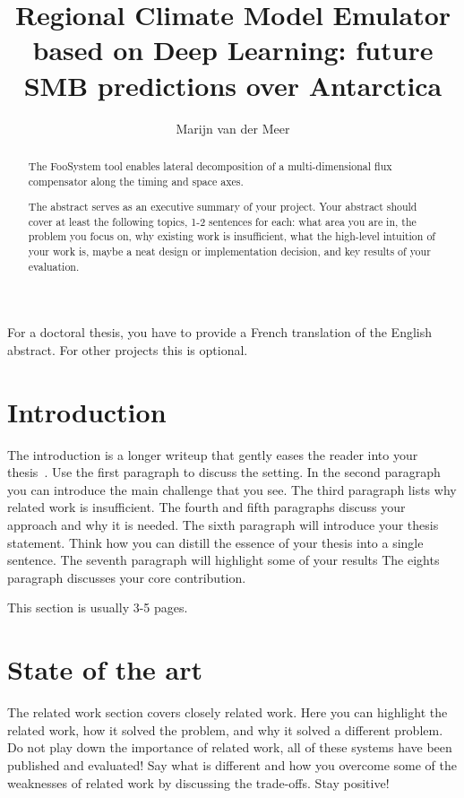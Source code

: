 \documentclass[a4paper,11pt,oneside]{report}
\title{Regional Climate Model Emulator based on Deep Learning: future SMB predictions over Antarctica}
\author{Marijn van der Meer}
\newcommand{\sysname}{FooSystem\xspace}
\begin{document}
\maketitle
\makededication
\makeacks

\begin{abstract}
The \sysname tool enables lateral decomposition of a multi-dimensional
flux compensator along the timing and space axes.

The abstract serves as an executive summary of your project.
Your abstract should cover at least the following topics, 1-2 sentences for
each: what area you are in, the problem you focus on, why existing work is
insufficient, what the high-level intuition of your work is, maybe a neat
design or implementation decision, and key results of your evaluation.
\end{abstract}

\begin{frenchabstract}
For a doctoral thesis, you have to provide a French translation of the
English abstract. For other projects this is optional.
\end{frenchabstract}

\maketoc

\chapter{Introduction}

The introduction is a longer writeup that gently eases the reader into your
thesis~\cite{dinesh20oakland}. Use the first paragraph to discuss the setting.
In the second paragraph you can introduce the main challenge that you see.
The third paragraph lists why related work is insufficient.
The fourth and fifth paragraphs discuss your approach and why it is needed.
The sixth paragraph will introduce your thesis statement. Think how you can
distill the essence of your thesis into a single sentence.
The seventh paragraph will highlight some of your results
The eights paragraph discusses your core contribution.

This section is usually 3-5 pages.

\chapter{State of the art}

The related work section covers closely related work. Here you can highlight
the related work, how it solved the problem, and why it solved a different
problem. Do not play down the importance of related work, all of these
systems have been published and evaluated! Say what is different and how
you overcome some of the weaknesses of related work by discussing the 
trade-offs. Stay positive!
\end{document}
